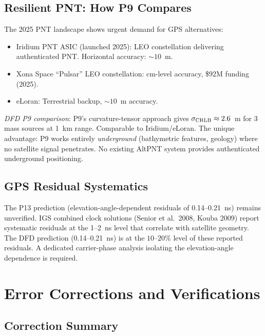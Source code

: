 \documentclass[aps,prd,twocolumn,superscriptaddress,nofootinbib]{revtex4-2}
\begin{document}
\subsection{Resilient PNT: How P9 Compares}

The 2025 PNT landscape shows urgent demand for GPS alternatives:
\begin{itemize}
\item Iridium PNT ASIC (launched 2025): LEO constellation delivering
authenticated PNT.  Horizontal accuracy: $\sim 10$~m.
\item Xona Space ``Pulsar'' LEO constellation: cm-level accuracy,
\$92M funding (2025).
\item eLoran: Terrestrial backup, $\sim 10$~m accuracy.
\end{itemize}

\textit{DFD P9 comparison}: P9's curvature-tensor approach gives
$\sigma_{\rm CRLB} \approx 2.6$~m for 3 mass sources at 1~km range.
Comparable to Iridium/eLoran.  The unique advantage: P9 works entirely
\emph{underground} (bathymetric features, geology) where no satellite
signal penetrates.  No existing AltPNT system provides authenticated
underground positioning.

\subsection{GPS Residual Systematics}

The P13 prediction (elevation-angle-dependent residuals of 0.14--0.21~ns)
remains unverified.  IGS combined clock solutions (Senior et al.\ 2008,
Kouba 2009) report systematic residuals at the 1--2~ns level that correlate
with satellite geometry.  The DFD prediction (0.14--0.21~ns) is at the
$10$--$20\%$ level of these reported residuals.  A dedicated carrier-phase
analysis isolating the elevation-angle dependence is required.

\section{Error Corrections and Verifications}
\label{sec:errors}

\subsection{Correction Summary}
\end{document}
